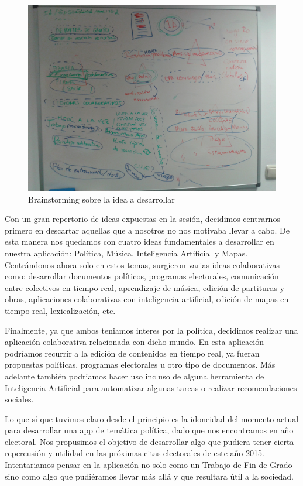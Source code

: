 \begin{figure}[H]
\centering
\includegraphics[keepaspectratio, scale=0.15]{Media/Captures/brainstorming.jpg}
\caption{Brainstorming sobre la idea a desarrollar}
\label{fig:brainstorming}
\end{figure}

Con un gran repertorio de ideas expuestas en la sesión, decidimos centrarnos primero en descartar aquellas que a nosotros no nos motivaba llevar a cabo. De esta manera nos quedamos con cuatro ideas fundamentales a desarrollar en nuestra aplicación: Política, Música, Inteligencia Artificial y Mapas. Centrándonos ahora solo en estos temas, surgieron varias ideas colaborativas como: desarrollar documentos políticos, programas electorales, comunicación entre colectivos en tiempo real, aprendizaje de música, edición de partituras y obras, aplicaciones colaborativas con inteligencia artificial, edición de mapas en tiempo real, lexicalización, etc.

Finalmente, ya que ambos teniamos interes por la política, decidimos realizar una aplicación colaborativa relacionada con dicho mundo. En esta aplicación podríamos recurrir a la edición de contenidos en tiempo real, ya fueran propuestas políticas, programas electorales u otro tipo de documentos. Más adelante también podriamos hacer uso incluso de alguna herramienta de Inteligencia Artificial para automatizar algunas tareas o realizar recomendaciones sociales.

Lo que sí que tuvimos claro desde el principio es la idoneidad del momento actual para desarrollar una app de temática política, dado que nos encontramos en año electoral. Nos propusimos el objetivo de desarrollar algo que pudiera tener cierta repercusión y utilidad en las próximas citas electorales de este año 2015. Intentariamos pensar en la aplicación no solo como un Trabajo de Fin de Grado sino como algo que pudiéramos llevar más allá y que resultara útil a la sociedad.

